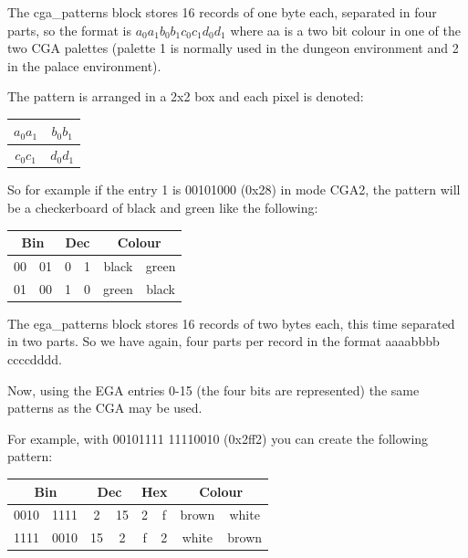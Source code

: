 \documentclass{article}
\begin{document}
\pagebreak[2]
 The cga\_patterns block stores 16 records of one byte each, separated in
 four parts, so the format is $a_0 a_1 b_0 b_1 c_0 c_1 d_0 d_1$ where aa is a two bit colour in one
 of the two CGA palettes (palette 1 is normally used in the  dungeon
 environment and 2 in the palace environment).
 
 The pattern is arranged in a 2x2 box and each pixel is denoted:
\begin{center}
\begin{tabular}{c|c}
  $a_0 a_1$ & $b_0 b_1$\\
  \hline
  $c_0 c_1$ & $d_0 d_1$\\
\end{tabular}
\end{center}
 
 So for example if the entry 1 is 00101000 (0x28) in mode CGA2, the pattern
 will be a checkerboard of black and green like the following:

\begin{center}
\begin{tabular}{cc|cc|cc}
  \multicolumn{2}{c}{Bin} & \multicolumn{2}{c}{Dec} & \multicolumn{2}{c}{Colour} \\
 \hline
  00 & 01  &    0 & 1 &    black &  green \\
  01 & 00  &    1 & 0 &    green &  black \\
\end{tabular}
\end{center}

 The ega\_patterns block stores 16 records of two bytes each, this time
 separated in two parts. So we have again, four parts per record in the
 format aaaabbbb ccccdddd.
 
 Now, using the EGA entries 0-15 (the four bits are represented) the same
 patterns as the CGA may be used.
 
 For example, with 00101111 11110010 (0x2ff2) you can create the following
 pattern:

\begin{center}
\begin{tabular}{cc|cc|cc|cc}
  \multicolumn{2}{c}{Bin} & \multicolumn{2}{c}{Dec} & \multicolumn{2}{c}{Hex} & \multicolumn{2}{c}{Colour} \\
 \hline
  0010 & 1111  &  2  & 15  & 2 & f &  brown &  white\\
  1111 & 0010  &  15 & 2   & f & 2 &  white &  brown\\
\end{tabular}
\end{center}
\end{document}
